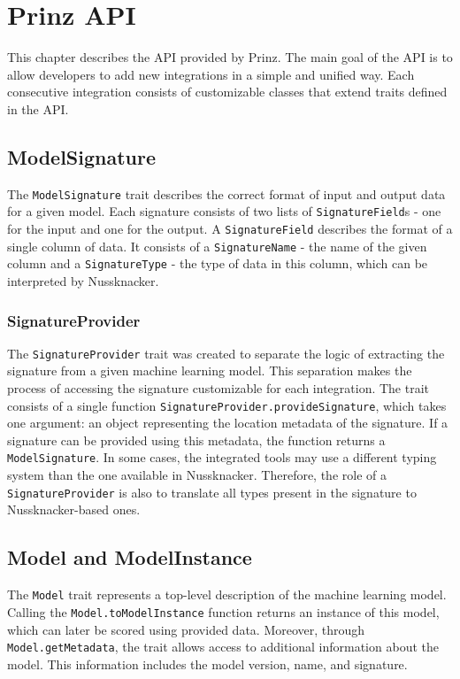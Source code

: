 \chapter{Prinz API}
\label{chap:prinz-api}

This chapter describes the API provided by Prinz. The main goal of the API is to allow developers to add new integrations in a simple and unified way. Each consecutive integration consists of customizable classes that extend traits defined in the API.

\section{ModelSignature}
\label{sec:model-signature}

The \texttt{ModelSignature} trait describes the correct format of input and output data for a given model. 
Each signature consists of two lists of \texttt{SignatureField}s - one for the input and one for the output. 
A \texttt{SignatureField} describes the format of a single column of data. 
It consists of a \texttt{SignatureName} - the name of the given column and a \texttt{SignatureType} - the type of data in this column, which can be interpreted by Nussknacker.

\subsection{SignatureProvider}

The \texttt{SignatureProvider} trait was created to separate the logic of extracting the signature from a given machine learning model.
This separation makes the process of accessing the signature customizable for each integration.
The trait consists of a single function \texttt{SignatureProvider.provideSignature}, which takes one argument: an object representing the location metadata of the signature.
If a signature can be provided using this metadata, the function returns a \texttt{ModelSignature}.
In some cases, the integrated tools may use a different typing system than the one available in Nussknacker.
Therefore, the role of a \texttt{SignatureProvider} is also to translate all types present in the signature to Nussknacker-based ones.

\section{Model and ModelInstance}

The \texttt{Model} trait represents a top-level description of the machine learning model.
Calling the \texttt{Model.toModelInstance} function returns an instance of this model, which can later be scored using provided data.
Moreover, through \texttt{Model.getMetadata}, the trait allows access to additional information about the model.
This information includes the model version, name, and signature.

